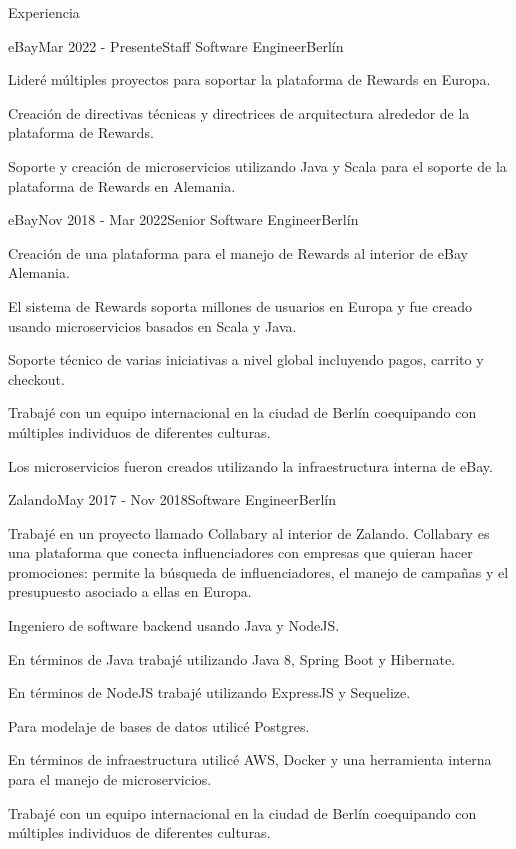 \documentclass[spanish]{resume} %
\begin{document}
\begin{rSection}{Experiencia}

\begin{rSubsection}{eBay}{Mar 2022 - Presente}{Staff Software Engineer}{Berl\'in}
\item Lider\'e m\'ultiples proyectos para soportar la plataforma de Rewards en Europa.
\item Creaci\'on de directivas t\'ecnicas y directrices de arquitectura alrededor de la plataforma de Rewards.
\item Soporte y creaci\'on de microservicios utilizando Java y Scala para el soporte de la plataforma de Rewards en Alemania.

\begin{rSubsection}{eBay}{Nov 2018 - Mar 2022}{Senior Software Engineer}{Berl\'in}
\item Creaci\'on de una plataforma para el manejo de Rewards al interior de eBay Alemania.
\item El sistema de Rewards soporta millones de usuarios en Europa y fue creado usando microservicios basados en Scala y Java.
\item Soporte t\'ecnico de varias iniciativas a nivel global incluyendo pagos, carrito y checkout.
\item Trabaj\'e con un equipo internacional en la ciudad de Berl\'in coequipando con m\'ultiples individuos de diferentes culturas.
\item Los microservicios fueron creados utilizando la infraestructura interna de eBay.


\begin{rSubsection}{Zalando}{May 2017 - Nov 2018}{Software Engineer}{Berl\'in}
\item Trabaj\'e en un proyecto llamado Collabary al interior de Zalando. Collabary es una plataforma que conecta influenciadores con empresas que quieran hacer promociones: permite la b\'usqueda de influenciadores, el manejo de campa\~nas y el presupuesto asociado a ellas en Europa.
\item Ingeniero de software backend usando Java y NodeJS.
\item En t\'erminos de Java trabaj\'e utilizando Java 8, Spring Boot y Hibernate.
\item En t\'erminos de NodeJS trabaj\'e utilizando ExpressJS y Sequelize.
\item Para modelaje de bases de datos utilic\'e Postgres.
\item En t\'erminos de infraestructura utilic\'e AWS, Docker y una herramienta interna para el manejo de microservicios.
\item Trabaj\'e con un equipo internacional en la ciudad de Berl\'in coequipando con m\'ultiples individuos de diferentes culturas.



\end{rSubsection}
\end{rSubsection}
\end{rSubsection}
\end{rSection}
\end{document}
